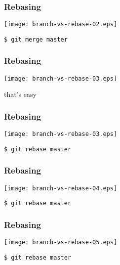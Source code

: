 \documentclass[english]{beamer}
\newcommand{\CMD}[1]{%
\texttt{\textcolor{code-blue}{#1}}%
}
\begin{document}
\begin{frame}
\frametitle{Rebasing}

\texttt{[image: branch-vs-rebase-02.eps]}
\vspace{\baselineskip}
\begin{flushleft}
        \CMD{\$ git merge master}
\end{flushleft}
\vspace{\textheight}
\end{frame}

\begin{frame}
\frametitle{Rebasing}

\texttt{[image: branch-vs-rebase-03.eps]}
\vspace{\baselineskip}
\begin{center}
        that's easy
\end{center}
\vspace{\textheight}
\end{frame}

\begin{frame}
\frametitle{Rebasing}

\texttt{[image: branch-vs-rebase-03.eps]}
\vspace{\baselineskip}
\begin{flushright}
        \CMD{\$ git rebase master}
\end{flushright}
\vspace{\textheight}
\end{frame}

\begin{frame}
\frametitle{Rebasing}

\texttt{[image: branch-vs-rebase-04.eps]}
\vspace{\baselineskip}
\begin{flushright}
        \CMD{\$ git rebase master}
\end{flushright}
\vspace{\textheight}
\end{frame}

\begin{frame}
\frametitle{Rebasing}

\texttt{[image: branch-vs-rebase-05.eps]}
\vspace{\baselineskip}
\begin{flushright}
        \CMD{\$ git rebase master}
\end{flushright}
\vspace{\textheight}
\end{frame}
\end{document}
